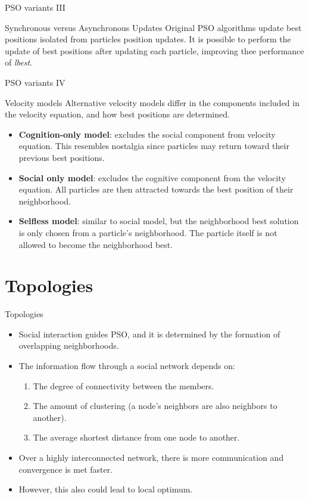 \documentclass[aspectratio=169,compress,10pt]{beamer}
\begin{document}
\begin{frame}{PSO variants III}
\begin{block}{Synchronous versus Asynchronous Updates}
Original PSO algorithms update best positions isolated from particles position updates.
It is possible to perform the update of best positions after updating each particle, improving thee performance of \emph{lbest}.
\end{block}
\end{frame}

\begin{frame}{PSO variants IV}
\begin{block}{Velocity models}
Alternative velocity models differ in the components included in the velocity equation, and how best positions are determined.
\begin{itemize}
	\item \textbf{Cognition-only model}: excludes the social component from velocity equation.
	This resembles nostalgia since particles may return toward their previous best positions.
	\item \textbf{Social only model}: excludes the cognitive component from the velocity equation.
	All particles are then attracted towards the best position of their neighborhood.
	\item \textbf{Selfless model}: similar to social model, but the neighborhood best solution is only chosen from a particle's neighborhood.
	The particle itself is not allowed to become the neighborhood best.
\end{itemize}
\end{block}
\end{frame}

\section{Topologies} 
\begin{frame}{Topologies}
\begin{itemize}
	\item Social interaction guides PSO, and it is determined by the formation of overlapping neighborhoods.
	\item The information flow through a social network depends on:
	\begin{enumerate}
		\item The degree of connectivity between the members.
		\item The amount of clustering (a node's neighbors are also neighbors to another).
		\item The average shortest distance from one node to another.
	\end{enumerate}
	\item Over a highly interconnected network, there is more communication and convergence is met faster.
	\item However, this also could lead to local optimum.
\end{itemize}
\end{frame}
\end{document}

